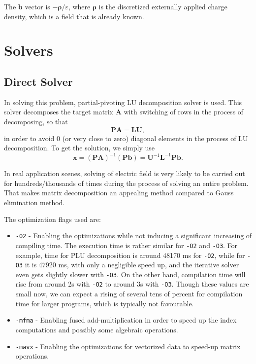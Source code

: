 \documentclass{article}
\begin{document}
\begin{spacing}{1.1}
The $\mathbf{b}$ vector is  $-\mathbf{\rho}/\varepsilon$, where $\mathbf{\rho}$ is the discretized externally applied charge density, which is a field that is already known.

\section{Solvers}

\subsection{Direct Solver}

In solving this problem, partial-pivoting LU decomposition solver is used. This solver decomposes the target matrix $\mathbf{A}$ with switching of rows in the process of decomposing, so that
\[\mathbf{PA = LU},\]
in order to avoid 0 (or very close to zero) diagonal elements in the process of LU decomposition. To get the solution, we simply use
\[\mathbf{x}=(\mathbf{PA})^{-1}(\mathbf{Pb})=\mathbf{U}^{-1}\mathbf{L}^{-1}\mathbf{Pb}.\]

In real application scenes, solving of electric field is very likely to be carried out for hundreds/thousands of times during the process of solving an entire problem. That makes matrix decomposition an appealing method compared to Gauss elimination method.

The optimization flags used are:
\begin{itemize}
    \item \texttt{-O2} - Enabling the optimizations while not inducing a significant increasing of compiling time. The execution time is rather similar for \texttt{-O2} and \texttt{-O3}. For example, time for PLU decomposition is around 48170 ms for \texttt{-O2}, while for \texttt{-O3} it is 47920 ms, with only a negligible speed up, and the iterative solver even gets slightly slower with \texttt{-O3}. On the other hand, compilation time will rise from around 2s with \texttt{-O2} to around 3s with \texttt{-O3}. Though these values are small now, we can expect a rising of several tens of percent for compilation time for larger programs, which is typically not favourable.
    \item \texttt{-mfma} - Enabling fused add-multiplication in order to speed up the index computations and possibly some algebraic operations.
    \item \texttt{-mavx} - Enabling the optimizations for vectorized data to speed-up matrix operations.
\end{itemize}


\end{spacing}
\end{document}
